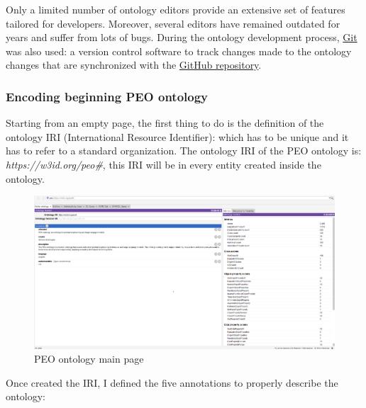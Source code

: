 Only a limited number of ontology editors provide an extensive set of features tailored for developers. Moreover, several editors have remained outdated for years and suffer from lots of bugs. During the ontology development process, \href{https://git-scm.com/}{Git} was also used: a version control software to track changes made to the ontology changes that are synchronized with the \href{https://github.com/simonegramegna/peo}{GitHub repository}.
\subsubsection{Encoding beginning PEO ontology}
Starting from an empty page, the first thing to do is the definition of the ontology IRI (International Resource Identifier): which has to be unique and it has to refer to a standard organization. The ontology IRI of the PEO ontology is: \textit{https://w3id.org/peo\#}, this IRI will be in every entity created inside the ontology.
\begin{figure}[H]
    \centering
    \includegraphics[width=1.0\linewidth]{Figures/fig_29.png}
    \caption{PEO ontology main page}
    \label{fig:enter-label}
\end{figure}
Once created the IRI, I defined the five annotations to properly describe the ontology:
